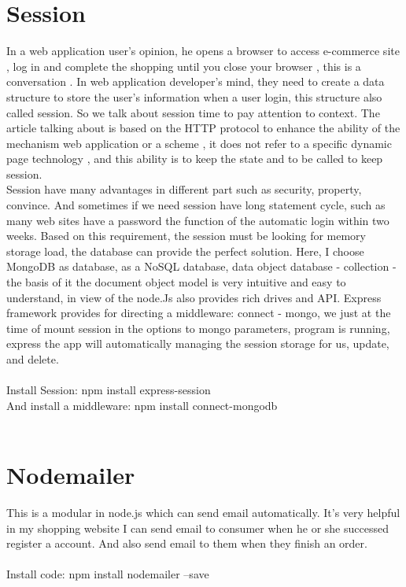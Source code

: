 {\section{Session \cite{session}} 
In a web application user’s opinion, he opens a browser to access e-commerce site , log in and complete the shopping until you close your browser , this is a conversation . In web application developer’s mind, they need to create a data structure to store the user's information when a user login, this structure also called session. So we talk about session time to pay attention to context. The article talking about is based on the HTTP protocol to enhance the ability of the mechanism web application or a scheme , it does not refer to a specific dynamic page technology , and this ability is to keep the state and to be called to keep session.\\
Session have many advantages in different part such as security, property, convince.
And sometimes if we need session have long statement cycle, such as many web sites have a password the function of the automatic login within two weeks. Based on this requirement, the session must be looking for memory storage load, the database can provide the perfect solution. Here, I choose MongoDB as database, as a NoSQL database, data object database - collection - the basis of it the document object model is very intuitive and easy to understand, in view of the node.Js also provides rich drives and API. Express framework provides for directing a middleware: connect - mongo, we just at the time of mount session in the options to mongo parameters, program is running, express the app will automatically managing the session storage for us, update, and delete.\\
\\
Install Session: npm install express-session \\
And install a middleware: npm install connect-mongodb \\
\\
\section{Nodemailer}	 
This is a modular in node.js which can send email automatically. It’s very helpful in my shopping website I can send email to consumer when he or she successed register a account. And also send email to them when they finish an order.\\
\\
Install code: npm install nodemailer –save\\
}
